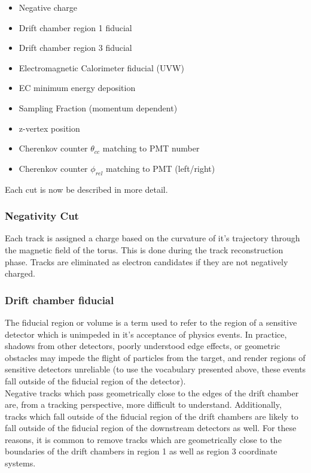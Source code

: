 \begin{itemize}
  \item{Negative charge}
  \item{Drift chamber region 1 fiducial}
  \item{Drift chamber region 3 fiducial}
  \item{Electromagnetic Calorimeter fiducial (UVW)}
  \item{EC minimum energy deposition}
  \item{Sampling Fraction (momentum dependent)}
  \item{z-vertex position}
  \item{Cherenkov counter $\theta_{cc}$ matching to PMT number}
  \item{Cherenkov counter $\phi_{rel}$ matching to PMT (left/right)}
\end{itemize}

Each cut is now be described in more detail.

\subsubsection*{Negativity Cut}
Each track is assigned a charge based on the curvature of it's trajectory through the magnetic field of the torus.  This is done during the track reconstruction phase.  Tracks are eliminated as electron candidates if they are not negatively charged.

\subsubsection*{Drift chamber fiducial}
The fiducial region or volume is a term used to refer to the region of a sensitive detector which is unimpeded in it's acceptance of physics events.  In practice, shadows from other detectors, poorly understood edge effects, or geometric obstacles may impede the flight of particles from the target, and render regions of sensitive detectors unreliable (to use the vocabulary presented above, these events fall outside of the fiducial region of the detector).  \\

Negative tracks which pass geometrically close to the edges of the drift chamber are, from a tracking perspective, more difficult to understand.  Additionally, tracks which fall outside of the fiducial region of the drift chambers are likely to fall outside of the fiducial region of the downstream detectors as well.  For these reasons, it is common to remove tracks which are geometrically close to the boundaries of the drift chambers in region 1 as well as region 3 coordinate systems.\\

